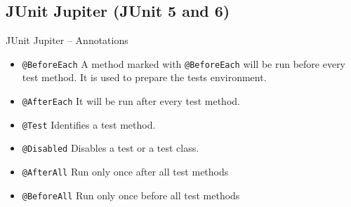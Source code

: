 \documentclass[11pt, xcolor=svgnames]{beamer}
\begin{document}

\subsection{JUnit Jupiter (JUnit 5 and 6)}


\begin{frame}{JUnit Jupiter -- Annotations}

  \begin{itemize}
    \item \texttt{@BeforeEach} A method marked with \texttt{@BeforeEach} will be run before every test method. It is used to prepare the tests environment.
    \item \texttt{@AfterEach} It will be run after every test method.
    \item \texttt{@Test} Identifies a test method.
    \item \texttt{@Disabled} Disables a test or a test class.
    \item \texttt{@AfterAll} Run only once after all test methods
    \item \texttt{@BeforeAll} Run only once before all test methods
    \end{itemize}
  \end{frame}
 

\end{document}
